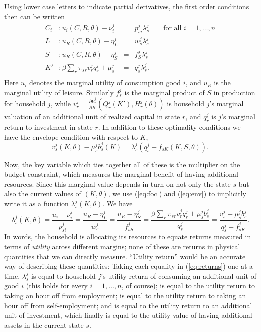 \documentclass[12pt,letterpaper]{article}
\newcommand{\Eq}[1]{(\ref{eq:#1})}
\begin{document}
Using lower case letters to indicate partial derivatives, the first order conditions then can be written
\begin{equation}
\label{eq:foc}
\begin{aligned}
  C_i &: u_i(C,R,\theta) - \nu^j_i &=& p^j_{si}\lambda^j_s \qquad\text{for all $i=1,\dots,n$}\\
  L   &: u_R(C,R,\theta) - \eta^j_L &=& w^j_s\lambda^j_s\\ 
  S   &: u_R(C,R,\theta) - \eta^j_S &=& f^j_{S}\lambda^j_s \\
  K'  &: \beta\sum_r\pi_{sr}v^j_{r}q^j_{r} + \mu^j_s &=& q^j_{s}\lambda^j_s.\\
\end{aligned}
\end{equation}
Here \(u_i\) denotes the marginal utility of consumption good \(i\), and \(u_R\)
is the marginal utility of leisure.  Similarly \(f^j_{s}\) is the marginal
product of \(S\) in production for household \(j\), while \(v^j_{r}=\frac{\partial
   V^j_{r}}{\partial K}(Q^j_{r}(K'),H^j_{r}(\theta))\) is household \(j\)'s
marginal valuation of an additional unit of realized capital in state
\(r\), and \(q^j_{r}\) is \(j\)'s marginal return to investment in state
\(r\).  In addition to these optimality conditions we have the envelope
condition with respect to \(K\),
\begin{equation}
\label{eq:env}
  v^j_{s}(K,\theta) - \mu^j_sb^j_s(K) = \lambda^j_s\left(q^j_s + f_{sK}(K,S,\theta)\right).
\end{equation}

Now, the key variable which ties together all of these is the
multiplier on the budget constraint, which measures the marginal
benefit of having additional resources.  Since this marginal value
depends in turn on not only the state \(s\) but also the current values
of \((K,\theta)\), we use \Eq{foc} and \Eq{env} to implicitly write it as a
function \(\lambda^j_s(K,\theta)\).  We have
\begin{equation}
\label{eq:returns}
   \lambda^j_s(K,\theta) = \frac{u_i - \nu^j_i}{p^j_{si}} = \frac{u_R - \eta^j_L}{w^j_s} =
   \frac{u_R-\eta^j_S}{f^j_{sS}}=\frac{\beta\sum_r\pi_{sr}v^j_{r}q^j_{r} +
     \mu^j_sb^j_s}{q^j_s} = \frac{v^j_{s}-\mu^j_sb^j_s}{q^j_s + f^j_{sK}}.
\end{equation}
In words, the household is allocating its resources to equate returns
measured in terms of \emph{utility} across different margins; none of
these are returns in physical quantities that we can directly measure.
``Utility return'' would be an accurate way of describing these
quantities: Taking each equality in \Eq{returns} one at a
time, \(\lambda^j_s\) is equal to household \(j\)'s utility return of
consuming an additional unit of good \(i\) (this holds for every
\(i=1,\dots,n\), of course); is equal to the utility return to taking an
hour off from employment; is equal to the utility return to taking an
hour off from self-employment; and is equal to the utility return to
an additional unit of investment, which finally is equal to the
utility value of having additional assets in the current state \(s\).
\end{document}
